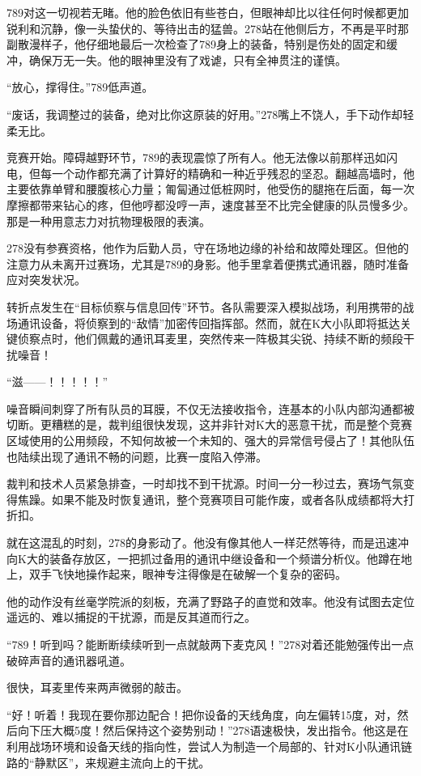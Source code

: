 \documentclass[a4paper]{book}
\begin{document}
789对这一切视若无睹。他的脸色依旧有些苍白，但眼神却比以往任何时候都更加锐利和沉静，像一头蛰伏的、等待出击的猛兽。278站在他侧后方，不再是平时那副散漫样子，他仔细地最后一次检查了789身上的装备，特别是伤处的固定和缓冲，确保万无一失。他的眼神里没有了戏谑，只有全神贯注的谨慎。

“放心，撑得住。”789低声道。

“废话，我调整过的装备，绝对比你这原装的好用。”278嘴上不饶人，手下动作却轻柔无比。

竞赛开始。障碍越野环节，789的表现震惊了所有人。他无法像以前那样迅如闪电，但每一个动作都充满了计算好的精确和一种近乎残忍的坚忍。翻越高墙时，他主要依靠单臂和腰腹核心力量；匍匐通过低桩网时，他受伤的腿拖在后面，每一次摩擦都带来钻心的疼，但他哼都没哼一声，速度甚至不比完全健康的队员慢多少。那是一种用意志力对抗物理极限的表演。

278没有参赛资格，他作为后勤人员，守在场地边缘的补给和故障处理区。但他的注意力从未离开过赛场，尤其是789的身影。他手里拿着便携式通讯器，随时准备应对突发状况。

转折点发生在“目标侦察与信息回传”环节。各队需要深入模拟战场，利用携带的战场通讯设备，将侦察到的“敌情”加密传回指挥部。然而，就在K大小队即将抵达关键侦察点时，他们佩戴的通讯耳麦里，突然传来一阵极其尖锐、持续不断的频段干扰噪音！

“滋——！！！！！”

噪音瞬间刺穿了所有队员的耳膜，不仅无法接收指令，连基本的小队内部沟通都被切断。更糟糕的是，裁判组很快发现，这并非针对K大的恶意干扰，而是整个竞赛区域使用的公用频段，不知何故被一个未知的、强大的异常信号侵占了！其他队伍也陆续出现了通讯不畅的问题，比赛一度陷入停滞。

裁判和技术人员紧急排查，一时却找不到干扰源。时间一分一秒过去，赛场气氛变得焦躁。如果不能及时恢复通讯，整个竞赛项目可能作废，或者各队成绩都将大打折扣。

就在这混乱的时刻，278的身影动了。他没有像其他人一样茫然等待，而是迅速冲向K大的装备存放区，一把抓过备用的通讯中继设备和一个频谱分析仪。他蹲在地上，双手飞快地操作起来，眼神专注得像是在破解一个复杂的密码。

他的动作没有丝毫学院派的刻板，充满了野路子的直觉和效率。他没有试图去定位遥远的、难以捕捉的干扰源，而是反其道而行之。

“789！听到吗？能断断续续听到一点就敲两下麦克风！”278对着还能勉强传出一点破碎声音的通讯器吼道。

很快，耳麦里传来两声微弱的敲击。

“好！听着！我现在要你那边配合！把你设备的天线角度，向左偏转15度，对，然后向下压大概5度！然后保持这个姿势别动！”278语速极快，发出指令。他这是在利用战场环境和设备天线的指向性，尝试人为制造一个局部的、针对K小队通讯链路的“静默区”，来规避主流向上的干扰。
\end{document}
